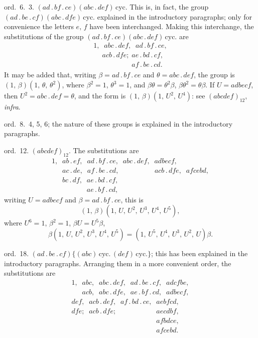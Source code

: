 \documentclass[11pt]{article}
\begin{document}
\smallskip
\hspace{1em} ord.\ 6.~3. $(ad\,.\,bf\,.\,ce)(abc\,.\,def)\,\text{cyc.}$ This
is, in fact, the group $(ad\,.\,be\,.\,cf)(abc\,.\,dfe)\,\text{cyc.}$
explained in the introductory paragraphs; only for convenience the letters
$e,\,f$ have been interchanged. Making this interchange, the substitutions
of the group $(ad\,.\,bf\,.\,ce)(abc\,.\,def)\,\text{cyc.}$ are
\[
\begin{array}{l}
1,\;\;abc\,.\,def,\;\;ad\,.\,bf\,.\,ce,\\
\phantom{1,\;}acb\,.\,dfe;\;ae\,.\,bd\,.\,cf,\\
\phantom{1,\;}\phantom{acb\,.\,dfe;\;}af\,.\,be\,.\,cd.
\end{array}
\]
It may be added that, writing $\beta=ad\,.\,bf\,.\,ce$ and
$\theta=abc\,.\,def$, the group is
$(1,\,\beta)(1,\,\theta,\,\theta^{2})$, where $\beta^{2}=1$,
$\theta^{3}=1$, and $\beta\theta=\theta^{2}\beta$,
$\beta\theta^{2}=\theta\beta$. If $U=adbecf$, then $U^{2}=abc\,.\,def=\theta$,
and the form is $(1,\,\beta)(1,\,U^{2},\,U^{4})$: see $(abcdef)_{12}$,
\emph{infra}.

\smallskip
\hspace{1em} ord.\ 8.~4, 5, 6; the nature of these groups is explained in the
introductory paragraphs.

\smallskip
\noindent ord.\ 12. $(abcdef)_{12}$. The substitutions are
\[
\begin{array}{l}
1,\;\; ab\,.\,ef,\;\; ad\,.\,bf\,.\,ce,\;\; abc\,.\,def,\;\; adbecf,\\
\phantom{1,\;\;}ac\,.\,de,\;\; af\,.\,be\,.\,cd,\;\; \phantom{abc\,.\,def,}\;\; acb\,.\,dfe,\;\; afcebd,\\
\phantom{1,\;\;}bc\,.\,df,\;\; ae\,.\,bd\,.\,cf,\\
\phantom{1,\;\;}\phantom{bc\,.\,df,\;\;}ae\,.\,bf\,.\,cd,
\end{array}
\]
writing $U=adbecf$ and $\beta=ad\,.\,bf\,.\,ce$, this is
\[
(1,\,\beta)(1,\,U,\,U^{2},\,U^{3},\,U^{4},\,U^{5}),
\]
where $U^{6}=1$, $\beta^{2}=1$, $\beta U=U^{5}\beta$,
\[
\beta(1,\,U,\,U^{2},\,U^{3},\,U^{4},\,U^{5})=(1,\,U^{5},\,U^{4},\,U^{3},\,U^{2},\,U)\beta.
\]

\smallskip
\hspace{1em} ord.\ 18. $(ad\,.\,be\,.\,cf)\{(abc)\,\text{cyc.}\,(def)\,\text{cyc.}\}$;
this has been explained in the introductory paragraphs. Arranging them in a
more convenient order, the substitutions are
\[
\begin{array}{l}
1,\;\; abc,\;\; abc\,.\,def,\;\; ad\,.\,be\,.\,cf,\;\; adcfbe,\\
\phantom{1,\;\;}acb,\;\; abc\,.\,dfe,\;\; ae\,.\,bf\,.\,cd,\;\; adbecf,\\
def,\;\; acb\,.\,def,\;\; af\,.\,bd\,.\,ce,\;\; aebfcd,\\
dfe;\;\; acb\,.\,dfe;\;\; \phantom{af\,.\,bd\,.\,ce,\;\;}aecdbf,\\
\phantom{dfe;\;\; acb\,.\,dfe;\;\;af\,.\,bd\,.\,ce,\;\;}afbdce,\\
\phantom{dfe;\;\; acb\,.\,dfe;\;\;af\,.\,bd\,.\,ce,\;\;}afcebd.
\end{array}
\]
\end{document}
